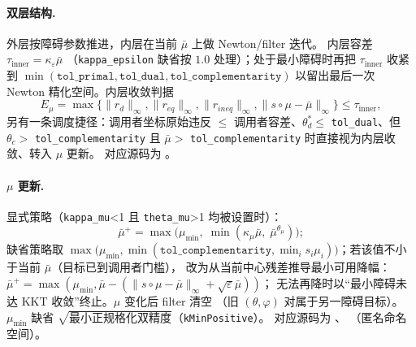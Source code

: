 \paragraph{双层结构.}
外层按障碍参数推进，内层在当前 $\bar\mu$ 上做 Newton/filter 迭代。
内层容差 $\tau_{\text{inner}} = \kappa_\varepsilon \bar\mu$
（\texttt{kappa\_epsilon} 缺省按 $1.0$ 处理）；处于最小障碍时再把
$\tau_{\text{inner}}$ 收紧到 $\min(\texttt{tol\_primal}, \texttt{tol\_dual},
\texttt{tol\_complementarity})$ 以留出最后一次 Newton 精化空间。内层收敛判据
\begin{equation}
  E_{\mu} = \max\bigl\{\|r_d\|_{\infty}, \|r_{eq}\|_{\infty},
  \|r_{ineq}\|_{\infty}, \|s \circ \mu - \bar\mu\|_{\infty}\bigr\}
  \le \tau_{\text{inner}},
  \label{eq:ipm:inner-conv}
\end{equation}
另有一条调度捷径：调用者坐标原始违反 $\le$ 调用者容差、$\theta_d^{*} \le$
\texttt{tol\_dual}、但 $\theta_c >$ \texttt{tol\_complementarity} 且
$\bar\mu >$ \texttt{tol\_complementarity} 时直接视为内层收敛、转入 $\mu$ 更新。
对应源码为 。

\paragraph{$\mu$ 更新.}
显式策略（\texttt{kappa\_mu}<1 且 \texttt{theta\_mu}>1 均被设置时）：
\begin{equation}
  \bar\mu^{+} = \max\bigl(\mu_{\min},\;
  \min(\kappa_\mu \bar\mu,\; \bar\mu^{\theta_\mu})\bigr);
  \label{eq:ipm:mu-explicit}
\end{equation}
缺省策略取 $\max\bigl(\mu_{\min}, \min(\texttt{tol\_complementarity},
\min_i s_i \mu_i)\bigr)$；若该值不小于当前 $\bar\mu$（目标已到调用者门槛），
改为从当前中心残差推导最小可用降幅：
$\bar\mu^{+} = \max(\mu_{\min}, \bar\mu -
(\|s \circ \mu - \bar\mu\|_{\infty} + \sqrt{\varepsilon}\bar\mu))$；
无法再降时以``最小障碍未达 KKT 收敛''终止。$\mu$ 变化后 filter 清空
（旧 $(\theta, \varphi)$ 对属于另一障碍目标）。$\mu_{\min}$ 缺省
$\sqrt{\text{最小正规格化双精度}}$（\texttt{kMinPositive}）。
对应源码为 、
（匿名命名空间）。

